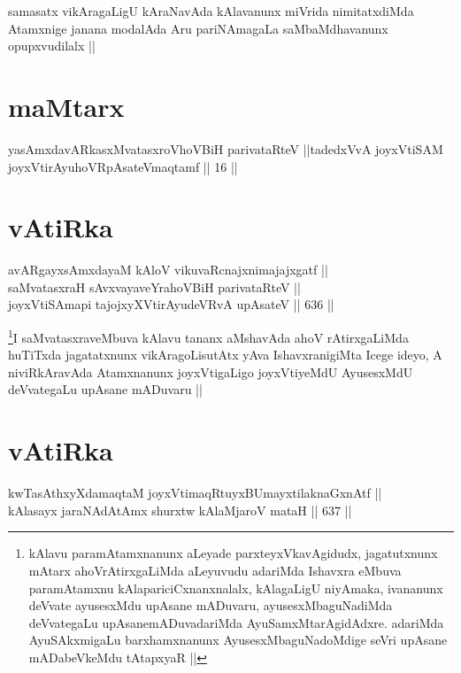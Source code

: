 \begin{artha}
samasatx vikAragaLigU kAraNavAda kAlavanunx miVrida nimitatxdiMda
Atamxnige janana modalAda Aru pariNAmagaLa saMbaMdhavanunx
opupxvudilalx ||
\end{artha}


\section*{maMtarx}

\begin{shl}
yasAmxdavARkasxMvatasxroV\s hoVBiH parivataRteV ||tadedxVvA joyxVtiSAM joyxVtirAyuhoVRpAsateV\s maqtamf || 16 ||
\end{shl}

\section*{vAtiRka}

\begin{shl}
avARgayxsAmxdayaM kAloV vikuvaRcnajxnimajajxgatf || \\
saMvatasxraH sAvxvayaveYrahoVBiH parivataRteV || \\
joyxVtiSAmapi tajojxyXVtirAyudeVRvA upAsateV ||  636 ||  
\end{shl}

\begin{artha}
\footnote{kAlavu paramAtamxnanunx aLeyade parxteyxVkavAgidudx,
  jagatutxnunx mAtarx ahoVrAtirxgaLiMda aLeyuvudu adariMda Ishavxra
  eMbuva paramAtamxnu kAlapariciCxnanxnalalx, kAlagaLigU niyAmaka,
  ivananunx deVvate ayusesxMdu upAsane mADuvaru, ayusesxMbaguNadiMda
  deVvategaLu upAsanemADuvadariMda AyuSamxMtarAgidAdxre. adariMda
  AyuSAkxmigaLu barxhamxnanunx AyusesxMbaguNadoMdige seVri upAsane
  mADabeVkeMdu tAtapxyaR  ||}I saMvatasxraveMbuva kAlavu tananx aMshavAda ahoV
rAtirxgaLiMda huTiTxda jagatatxnunx vikAragoLisutAtx yAva
IshavxranigiMta Icege ideyo, A niviRkAravAda Atamxnanunx joyxVtigaLigo
joyxVtiyeMdU AyusesxMdU deVvategaLu upAsane mADuvaru ||
\end{artha}

\section*{vAtiRka}


\begin{shl}
kwTasAthxyXdamaqtaM joyxVtimaqRtuyxBUmayxtilaknaGxnAtf ||  \\
kAlasayx jaraNAdAtAmx shurxtw kAlaMjaroV mataH ||  637 ||  
\end{shl}

